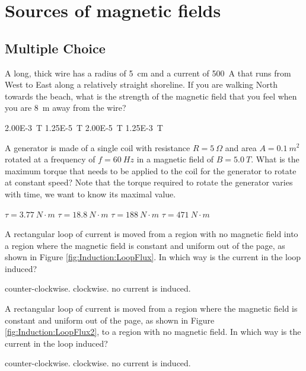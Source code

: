 \section{Sources of magnetic fields}

\subsection{Multiple Choice}

\question A long, thick wire has a radius of \SI{5}{cm} and a current of \SI{500}{A} that runs from West to East along a relatively straight shoreline. If you are walking North towards the beach, what is the strength of the magnetic field that you feel when you are \SI{8}{m} away from the wire?
\begin{checkboxes}
\choice \SI{2.00E-3}{T}
\CorrectChoice \SI{1.25E-5}{T} \correct
\choice \SI{2.00E-5}{T}
\choice \SI{1.25E-3}{T}
\end{checkboxes}

\question A generator is made of a single coil with resistance $R=\SI{5}{\Omega}$ and area $A=\SI{0.1}{m^2}$ rotated at a frequency of $f=\SI{60}{Hz}$ in a magnetic field of $B=\SI{5.0}{T}$. What is the maximum torque that needs to be applied to the coil for the generator to rotate at constant speed? Note that the torque required to rotate the generator varies with time, we want to know its maximal value.
\begin{choices}
	\choice $\tau=\SI{3.77}{N\cdot m}$
	\CorrectChoice $\tau=\SI{18.8}{N\cdot m}$
	\choice $\tau=\SI{188}{N\cdot m}$
	\choice $\tau=\SI{471}{N\cdot m}$
\end{choices}


\question A rectangular loop of current is moved from a region with no magnetic field into a region where the magnetic field is constant and uniform out of the page, as shown in Figure \ref{fig:Induction:LoopFlux}. In which way is the current in the loop induced?
\begin{checkboxes}
	\choice counter-clockwise.
	\CorrectChoice clockwise.
	\choice no current is induced.
\end{checkboxes}


\question A rectangular loop of current is moved from a region where the magnetic field is constant and uniform out of the page, as shown in Figure \ref{fig:Induction:LoopFlux2}, to a region with no magnetic field. In which way is the current in the loop induced?
\begin{checkboxes}
	\CorrectChoice counter-clockwise.
	\choice clockwise.
	\choice no current is induced.
\end{checkboxes}


